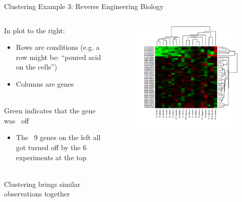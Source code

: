 \documentclass[aspectratio=169]{../latex_main/tntbeamer}  %
\begin{document}
	
	
	\begin{frame}{Clustering Example 3: Reverse Engineering Biology}
	    \begin{columns}
	    

	        \begin{column}{.5\textwidth}
	               In plot to the right:
	               \begin{itemize}
	                   \item Rows are conditions (e.g. a row might be: “poured acid on the cells”)
	                   \item Columns are genes
	               \end{itemize}
	                   \\
	                   \bigskip
	                   Green indicates that the gene was ~off
	                   \begin{itemize}
	                       \item The ~9 genes on the left all got turned off by the 6 experiments at the top
	                   \end{itemize}
	                   \\
	                   \bigskip
                        Clustering brings similar observations together

	        \end{column}
	        
	        
	        \begin{column}{.5\textwidth}
	                 \begin{figure}
	                    \centering
	                    \includegraphics[scale=.6]{Bild6}
	                \end{figure}
	        \end{column}
	    \end{columns}
	\end{frame}
\end{document}
